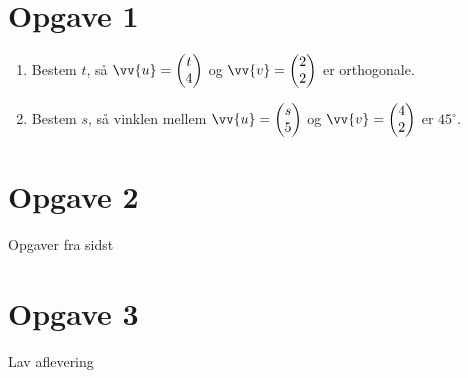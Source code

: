 

\section*{Opgave 1}
\begin{enumerate}[label=\roman*)]
\item Bestem $t$, så $\vv{u} = \begin{pmatrix}
t \\ 4
\end{pmatrix}$ og $\vv{v} = \begin{pmatrix}
2 \\ 2
\end{pmatrix}$
 er orthogonale.
\item Bestem $s$, så vinklen mellem $\vv{u} = \begin{pmatrix}
s \\ 5
\end{pmatrix}$ og $\vv{v} = \begin{pmatrix}
4 \\ 2
\end{pmatrix}$
er $45^\circ$. 
\end{enumerate}

\section*{Opgave 2}
Opgaver fra sidst

\section*{Opgave 3}
Lav aflevering